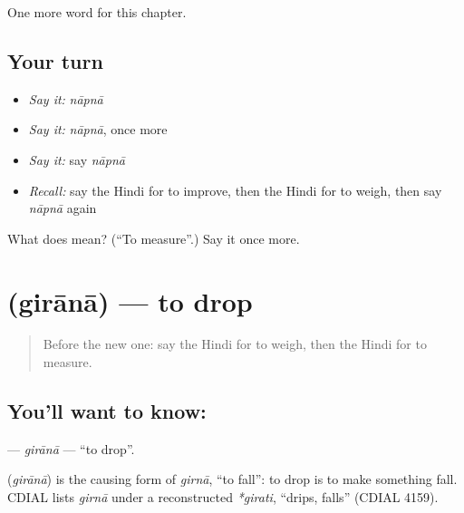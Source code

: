 \begin{grammarlens}[title={What you've built}]
One more word for this chapter.
\end{grammarlens}

\subsection*{Your turn}
\begin{itemize}
\raggedright
  \item \emph{Say it:} \emph{nāpnā}
  \item \emph{Say it:} \emph{nāpnā}, once more
  \item \emph{Say it:} say \emph{nāpnā}
  \item \emph{Recall:} say the Hindi for to improve, then the Hindi for to weigh, then say \emph{nāpnā} again
\end{itemize}

\begin{tcolorbox}[breakable,colback=teal!4,colframe=teal!35!black,title={Before you move on}]
What does  mean? (\textquotedblleft{}To measure\textquotedblright{}.) Say it once more.
\end{tcolorbox}
\section[\texorpdfstring{\hi{गिराना} (girānā)}{गिराना (girānā)}]{ (girānā) — to drop}

\label{lesson:HI-C175-girana}



\begin{quote}
Before the new one: say the Hindi for to weigh, then the Hindi for to measure.
\end{quote}

\subsection*{You'll want to know: }
\textbf{} — \emph{girānā} — \textquotedblleft{}to drop\textquotedblright{}.

\begin{cousinweb}
\textbf{} (\emph{girānā}) is the causing form of \emph{girnā}, \textquotedblleft{}to fall\textquotedblright{}: to drop is to make something fall. CDIAL lists \emph{girnā} under a reconstructed \emph{*girati}, \textquotedblleft{}drips, falls\textquotedblright{} (CDIAL 4159).
\end{cousinweb}

